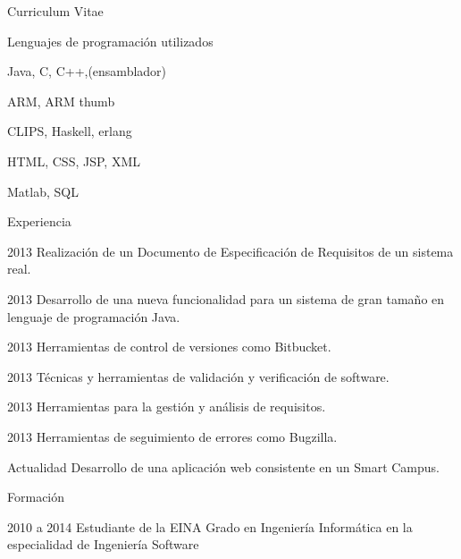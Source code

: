 \begin{cv}{Curriculum Vitae}

\begin{cvlist}{Lenguajes de programación utilizados}
\item Java, C, C++,(ensamblador)
\item ARM, ARM thumb
\item CLIPS, Haskell, erlang
\item HTML, CSS, JSP, XML
\item Matlab, SQL
\end{cvlist}

\begin{cvlist}{Experiencia}

	\item[2013] Realización de un Documento de Especificación de Requisitos 
				de un sistema real.
	
	\item[2013] Desarrollo de una nueva funcionalidad para un sistema de gran 
				tama\~no en lenguaje de programación Java.
	
	\item[2013] Herramientas de control de versiones como Bitbucket.
	
	\item[2013] Técnicas y herramientas de validación y verificación de software.
	
	\item[2013] Herramientas para la gestión y análisis de requisitos.
	
	\item[2013] Herramientas de seguimiento de errores como Bugzilla.
	
	\item[Actualidad] Desarrollo de una aplicación web consistente en un Smart Campus.

\end{cvlist}

\begin{cvlist}{Formación}

	\item[2010 a 2014] Estudiante de la EINA
		Grado en Ingeniería Informática en la especialidad de Ingeniería Software


\end{cvlist}

\end{cv}